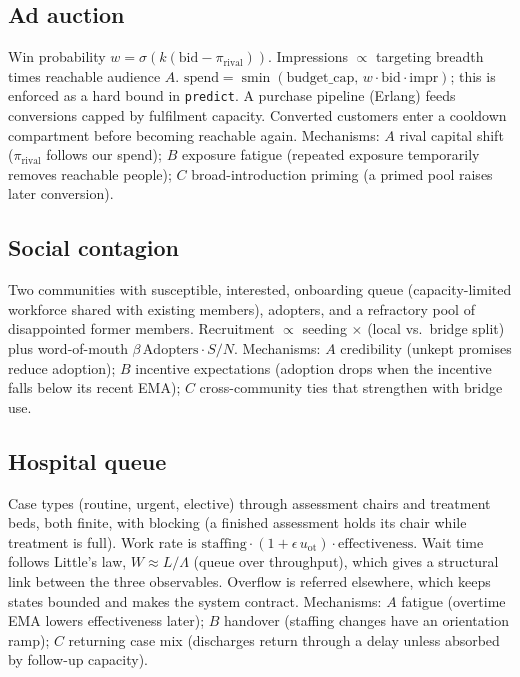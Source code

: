 \documentclass[11pt]{article}
\theoremstyle{plain}
\theoremstyle{definition}
\theoremstyle{remark}
\newcommand{\softmin}{\operatorname{smin}}
\begin{document}
\subsection{Ad auction}
Win probability $w=\sigma(k(\text{bid}-\pi_{\text{rival}}))$. Impressions $\propto$ targeting breadth times reachable audience $A$. $\text{spend}=\softmin(\text{budget\_cap},\,w\cdot\text{bid}\cdot\text{impr})$; this is enforced as a hard bound in \texttt{predict}. A purchase pipeline (Erlang) feeds conversions capped by fulfilment capacity. Converted customers enter a cooldown compartment before becoming reachable again. Mechanisms: $A$ rival capital shift ($\pi_{\text{rival}}$ follows our spend); $B$ exposure fatigue (repeated exposure temporarily removes reachable people); $C$ broad-introduction priming (a primed pool raises later conversion).

\subsection{Social contagion}
Two communities with susceptible, interested, onboarding queue (capacity-limited workforce shared with existing members), adopters, and a refractory pool of disappointed former members. Recruitment $\propto$ seeding $\times$ (local vs.\ bridge split) plus word-of-mouth $\beta\,\text{Adopters}\cdot S/N$. Mechanisms: $A$ credibility (unkept promises reduce adoption); $B$ incentive expectations (adoption drops when the incentive falls below its recent EMA); $C$ cross-community ties that strengthen with bridge use.

\subsection{Hospital queue}
Case types (routine, urgent, elective) through assessment chairs and treatment beds, both finite, with blocking (a finished assessment holds its chair while treatment is full). Work rate is $\text{staffing}\cdot(1+\epsilon\,u_{\text{ot}})\cdot\text{effectiveness}$. Wait time follows Little's law, $W\approx L/\Lambda$ (queue over throughput), which gives a structural link between the three observables. Overflow is referred elsewhere, which keeps states bounded and makes the system contract. Mechanisms: $A$ fatigue (overtime EMA lowers effectiveness later); $B$ handover (staffing changes have an orientation ramp); $C$ returning case mix (discharges return through a delay unless absorbed by follow-up capacity).

\end{document}
